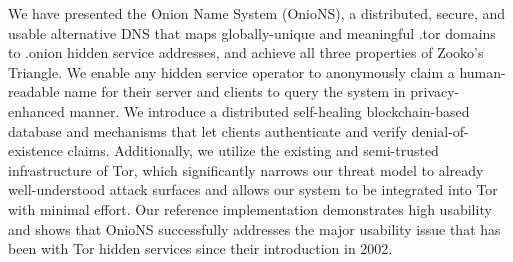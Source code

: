 \documentclass{sig-alternate}
\begin{document}
We have presented the Onion Name System (OnioNS), a distributed, secure, and usable alternative DNS that maps globally-unique and meaningful .tor domains to .onion hidden service addresses, and achieve all three properties of Zooko's Triangle. We enable any hidden service operator to anonymously claim a human-readable name for their server and clients to query the system in privacy-enhanced manner. We introduce a distributed self-healing blockchain-based database and mechanisms that let clients authenticate and verify denial-of-existence claims. Additionally, we utilize the existing and semi-trusted infrastructure of Tor, which significantly narrows our threat model to already well-understood attack surfaces and allows our system to be integrated into Tor with minimal effort. Our reference implementation demonstrates high usability and shows that OnioNS successfully addresses the major usability issue that has been with Tor hidden services since their introduction in 2002.

%
\end{document}
